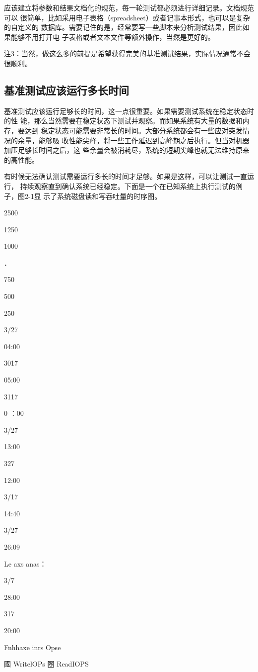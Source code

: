 应该建立将参数和结果文档化的规范，每一轮测试都必须进行详细记录。文档规范可以
很简单，比如采用电子表格（spreadsheet）或者记事本形式，也可以是复杂的自定义的
数据库。需要记住的是，经常要写一些脚本来分析测试结果，因此如果能够不用打开电
子表格或者文本文件等额外操作，当然是更好的。

注3：当然，做这么多的前提是希望获得完美的基准测试结果，实际情况通常不会很顺利。

\subsection{基准测试应该运行多长时间}
基准测试应该运行足够长的时间，这一点很重要。如果需要测试系统在稳定状态时的性
能，那么当然需要在稳定状态下测试并观察。而如果系统有大量的数据和内存，要达到
稳定状态可能需要非常长的时间。大部分系统都会有一些应对突发情况的余量，能够吸
收性能尖峰，将一些工作延迟到高峰期之后执行。但当对机器加压足够长时间之后，这
些余量会被消耗尽，系统的短期尖峰也就无法维持原来的高性能。

有时候无法确认测试需要运行多长的时间才足够。如果是这样，可以让测试一直运行，
持续观察直到确认系统已经稳定。下面是一个在已知系统上执行测试的例子，图2-1显
示了系统磁盘读和写吞吐量的时序图。

2500

1250

1000

．

750

500

250

3/27

04:00

3017

05:00

3117

0 ：00

3/27

13:00

327

12:00

3/17

14:40

3/27

26:09

Le axs anas：

3/7

28:00

317

20:00

Fnhhaxe inrs Opse

國 WritelOPs 圈 ReadIOPS

